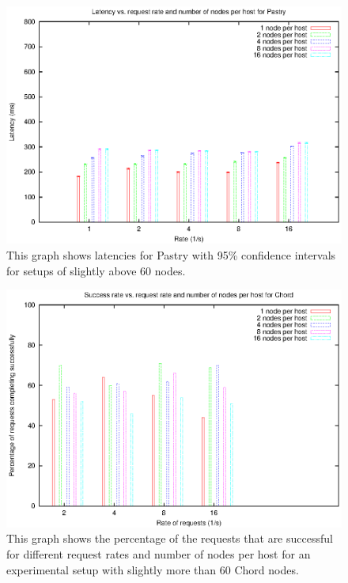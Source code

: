 \begin{figure}[!htbp]
  \begin{center}
    \includegraphics[width=0.9\linewidth]{illustrations/latency_pastry.eps}
    \caption{This graph shows latencies for Pastry with 95\% confidence intervals for setups of slightly above 60 nodes.}
    \label{figPastryLatency}
  \end{center}
\end{figure}

\begin{figure}[!htbp]
  \begin{center}
    \includegraphics[width=0.9\linewidth]{illustrations/success_rate_chord.eps}
    \caption{This graph shows the percentage of the requests that are successful for different request rates and number of nodes per host for an experimental setup with slightly more than 60 Chord nodes.}
    \label{figChordSuccessRate}
  \end{center}
\end{figure}

